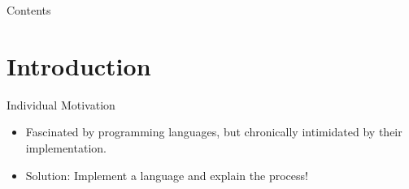 \documentclass[presentation, bigger]{beamer}
\begin{document}
\maketitle


\begin{frame}[label={sec:org8697d20}]{Contents}
\tableofcontents
\end{frame}


\section{Introduction}
\label{sec:org136fcb5}

\begin{frame}[label={sec:org82d0b5f}]{Individual Motivation}
\begin{itemize}
\item Fascinated by programming languages, but chronically intimidated by
their implementation.
\end{itemize}

\pause

\begin{itemize}
\item Solution: Implement a language and explain the process!
\end{itemize}
\end{frame}
\end{document}
